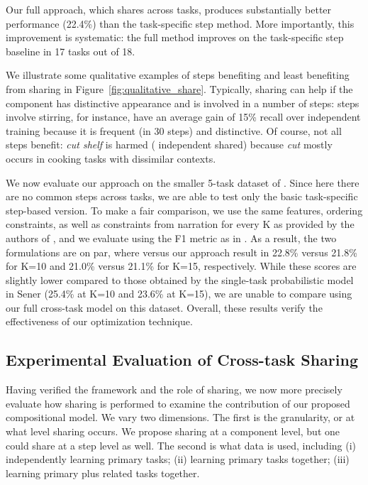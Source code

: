 \documentclass[10pt,twocolumn,letterpaper]{article}
\begin{document}
Our full approach, which shares across tasks, produces substantially better performance (22.4\%) than the task-specific
step method. More importantly, this improvement is systematic: the full method improves on the task-specific step
baseline in 17 tasks out of 18.

We illustrate some qualitative examples of steps benefiting and least benefiting from sharing
in Figure~\ref{fig:qualitative_share}. Typically, sharing can help if the component has distinctive
appearance and is involved in a number of steps: steps involve stirring, for
instance, have an average gain of 15\% recall over independent training because it is frequent (in 30 steps)
and distinctive. Of course, not all steps benefit: {\it cut shelf} is harmed ( independent   shared)
because {\it cut} mostly occurs in cooking tasks with dissimilar contexts.

 We now evaluate our approach on the smaller 5-task
dataset of \cite{Alayrac15Unsupervised}.  Since here there are no common steps across tasks, we are able to test only the
basic task-specific step-based version.  To make a fair comparison, we use the same features, ordering constraints, as
well as constraints from narration for every K as provided by the authors of \cite{Alayrac15Unsupervised}, and we
evaluate using the F1 metric as in \cite{Alayrac15Unsupervised}.  As a result, the two formulations are on par, where
\cite{Alayrac15Unsupervised} versus our approach result in 22.8\% versus 21.8\% for K=10 and 21.0\% versus 21.1\% for
K=15, respectively. While these scores are slightly lower compared to those obtained by the single-task probabilistic model
in Sener \cite{sener18unsupervised} (25.4\% at K=10 and 23.6\% at K=15), we are unable to compare using our full cross-task model on this
dataset. Overall, these results verify the effectiveness of our optimization technique.

\subsection{Experimental Evaluation of Cross-task Sharing}
\label{subsec:exp_sharing}

Having verified the framework and the role of sharing, we now more precisely evaluate
how sharing is performed to examine the contribution of our proposed compositional model.
We vary two dimensions.  The first is the granularity, or at what level sharing occurs. We propose
sharing at a component level, but one could share at a step level as well. The second is
what data is used, including (i) independently learning primary tasks; (ii) learning primary
tasks together; (iii) learning primary plus related tasks together.
\end{document}
